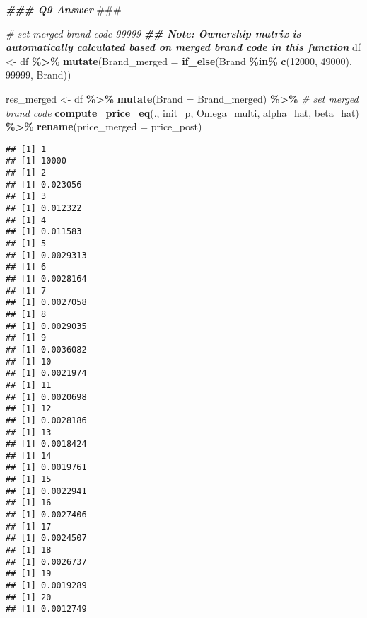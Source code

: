 \documentclass[
]{article}
\newenvironment{Shaded}{\begin{snugshade}}{\end{snugshade}}
\newcommand{\AlertTok}[1]{\textcolor[rgb]{0.94,0.16,0.16}{#1}}
\newcommand{\AttributeTok}[1]{\textcolor[rgb]{0.13,0.29,0.53}{#1}}
\newcommand{\CommentTok}[1]{\textcolor[rgb]{0.56,0.35,0.01}{\textit{#1}}}
\newcommand{\DecValTok}[1]{\textcolor[rgb]{0.00,0.00,0.81}{#1}}
\newcommand{\DocumentationTok}[1]{\textcolor[rgb]{0.56,0.35,0.01}{\textbf{\textit{#1}}}}
\newcommand{\FunctionTok}[1]{\textcolor[rgb]{0.13,0.29,0.53}{\textbf{#1}}}
\newcommand{\NormalTok}[1]{#1}
\newcommand{\OtherTok}[1]{\textcolor[rgb]{0.56,0.35,0.01}{#1}}
\newcommand{\SpecialCharTok}[1]{\textcolor[rgb]{0.81,0.36,0.00}{\textbf{#1}}}
\begin{document}
\begin{Shaded}
\begin{Highlighting}[]
\DocumentationTok{\#\#\# Q9 Answer }\AlertTok{\#\#\#}

\CommentTok{\# set merged brand code 99999}
\DocumentationTok{\#\# Note: Ownership matrix is automatically calculated based on merged brand code in this function}
\NormalTok{df }\OtherTok{\textless{}{-}}\NormalTok{ df }\SpecialCharTok{\%\textgreater{}\%}
  \FunctionTok{mutate}\NormalTok{(}\AttributeTok{Brand\_merged =} \FunctionTok{if\_else}\NormalTok{(Brand }\SpecialCharTok{\%in\%} \FunctionTok{c}\NormalTok{(}\DecValTok{12000}\NormalTok{, }\DecValTok{49000}\NormalTok{), }\DecValTok{99999}\NormalTok{, Brand))}


\NormalTok{res\_merged }\OtherTok{\textless{}{-}}\NormalTok{ df }\SpecialCharTok{\%\textgreater{}\%}
  \FunctionTok{mutate}\NormalTok{(}\AttributeTok{Brand =}\NormalTok{ Brand\_merged) }\SpecialCharTok{\%\textgreater{}\%} \CommentTok{\# set merged brand code}
  \FunctionTok{compute\_price\_eq}\NormalTok{(., init\_p, Omega\_multi, alpha\_hat, beta\_hat) }\SpecialCharTok{\%\textgreater{}\%}
  \FunctionTok{rename}\NormalTok{(}\AttributeTok{price\_merged =}\NormalTok{ price\_post)}
\end{Highlighting}
\end{Shaded}

\begin{verbatim}
## [1] 1
## [1] 10000
## [1] 2
## [1] 0.023056
## [1] 3
## [1] 0.012322
## [1] 4
## [1] 0.011583
## [1] 5
## [1] 0.0029313
## [1] 6
## [1] 0.0028164
## [1] 7
## [1] 0.0027058
## [1] 8
## [1] 0.0029035
## [1] 9
## [1] 0.0036082
## [1] 10
## [1] 0.0021974
## [1] 11
## [1] 0.0020698
## [1] 12
## [1] 0.0028186
## [1] 13
## [1] 0.0018424
## [1] 14
## [1] 0.0019761
## [1] 15
## [1] 0.0022941
## [1] 16
## [1] 0.0027406
## [1] 17
## [1] 0.0024507
## [1] 18
## [1] 0.0026737
## [1] 19
## [1] 0.0019289
## [1] 20
## [1] 0.0012749
\end{verbatim}
\end{document}
